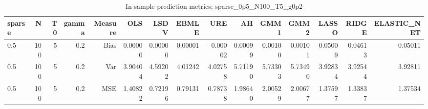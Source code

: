 \begin{table}[!htbp]\centering
\caption{In-sample prediction metrics: sparse_0p5_N100_T5_g0p2}
\label{tab:table2_sparse_0p5_N100_T5_g0p2}
\begin{tabular}{lrrrrrrrrrrrrrr}
\hline
sparse & N & T0 & gamma & Measure & OLS & LSDV & EBMLE & URE & AH & GMM1 & GMM2 & LASSO & RIDGE & ELASTIC_NET \\
\hline
0.5 & 100 & 5 & 0.2 & Bias & 0.00000 & 0.00000 & 0.00001 & -0.00002 & 0.00099 & 0.00100 & 0.00101 & 0.05009 & 0.04613 & 0.05011 \\
0.5 & 100 & 5 & 0.2 & Var & 3.90404 & 4.59202 & 4.01242 & 4.02758 & 5.71190 & 5.73303 & 5.73490 & 3.92834 & 3.92544 & 3.92811 \\
0.5 & 100 & 5 & 0.2 & MSE & 1.40822 & 0.72196 & 0.79131 & 0.78738 & 1.98640 & 2.00529 & 2.00677 & 1.37597 & 1.33837 & 1.37534 \\
\hline
\end{tabular}
\end{table}

